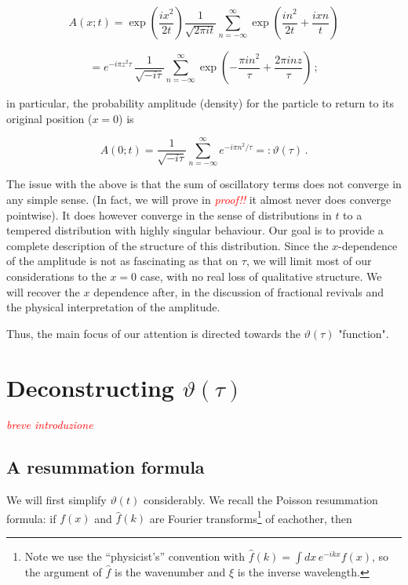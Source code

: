 \documentclass{article}
\newcommand{\T}{\ensuremath{\vartheta}}
\newcommand{\cmnt}[1]{\textcolor{red}{\emph{#1}}}
\newcommand{\sumZ}{\sum_{n=-\infty}^{\infty}}
\begin{document}
\begin{equation}
    A(x;t) = \exp(\frac{ix^2}{2t}) \frac{1}{\sqrt{2\pi i t}} \sumZ \exp( \frac{in^2}{2t} + \frac{ixn}{t} ) 
\end{equation}


\begin{equation} \label{amplitudeztau}
    = e^{-i\pi z^2 \tau}\, \frac{1}{\sqrt{-i\tau}} \sumZ \exp(-\frac{\pi i n^2}{\tau} +  \frac{2\pi i n z}{\tau})   \,;
\end{equation}


in particular, the probability amplitude (density) for the particle to return to its original position ($x=0$) is

\begin{equation}
    A(0;t) = \frac{1}{\sqrt{-i\tau}} \sumZ e^{-{i \pi n^2}/{\tau}} =: \T(\tau)\,.
\end{equation}


The issue with the above is that the sum of oscillatory terms does not converge in any simple sense. (In fact, we will prove in \cmnt{proof!!} it almost never does converge pointwise). It does however converge in the sense of distributions in $t$ to a tempered distribution with highly singular behaviour. Our goal is to provide a complete description of the structure of this distribution. Since the $x$-dependence of the amplitude is not as fascinating as that on $\tau$, we will limit most of our considerations to the $x=0$ case, with no real loss of qualitative structure. We will recover the $x$ dependence after, in the discussion of fractional revivals and the physical interpretation of the amplitude.

Thus, the main focus of our attention is directed towards the $\T(\tau)$ "function".


\section{Deconstructing $\T(\tau)$}

\cmnt{breve introduzione}

\subsection{A resummation formula}\label{resummation}

We will first simplify $\T(t)$ considerably. We recall the Poisson resummation formula\cite{bellman}: if $f(x)$ and $\hat f(k)$ are Fourier transforms\footnote{Note we use the ``physicist's'' convention with $\hat f(k) = \int dx\, e^{-ikx} f(x)$, so the argument of $\hat f$ is the wavenumber and $\xi$ is the inverse wavelength.} of eachother, then
\end{document}
